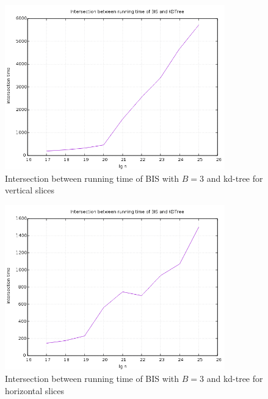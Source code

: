 \begin{figure}[h]
    \centering
    \includegraphics[width = 0.85\textwidth]{pictures/analysis/threes/vert.png}
    \caption{Intersection between running time of BIS with $B=3$ and kd-tree for vertical slices}\label{fig:b3_vert_intersection}
\end{figure}


\begin{figure}[h]
    \centering
    \includegraphics[width = 0.85\textwidth]{pictures/analysis/threes/hori.png}
    \caption{Intersection between running time of BIS with $B=3$ and kd-tree for horizontal slices}\label{fig:b3_hori_intersection}
\end{figure}


